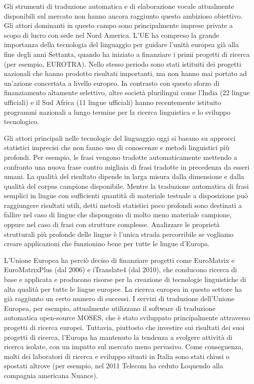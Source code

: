 \documentclass[]{../../metanetpaper}
\begin{document}
\begin{multicols}{2}
Gli strumenti di traduzione automatica e di elaborazione vocale attualmente
disponibili sul mercato non hanno ancora raggiunto questo ambizioso
obiettivo. Gli attori dominanti in questo campo sono principalmente imprese
private a scopo di lucro con sede nel Nord America. L'UE ha compreso la grande
importanza della tecnologia del linguaggio per guidare l'unit\`{a} europea
gi\`{a} alla fine degli anni Settanta, quando ha iniziato a finanziare i primi
progetti di ricerca (per esempio, EUROTRA). Nello stesso periodo sono stati
istituiti dei progetti nazionali che hanno prodotto risultati importanti, ma
non hanno mai portato ad un'azione concertata a livello europeo. In contrasto
con questo sforzo di finanziamento altamente selettivo, altre societ\`{a}
plurilingui come l'India (22 lingue ufficiali) e il Sud Africa (11 lingue
ufficiali) hanno recentemente istituito programmi nazionali a lungo termine
per la ricerca linguistica e lo sviluppo tecnologico.

Gli attori principali nelle tecnologie del linguaggio oggi si basano su
approcci statistici imprecisi che non fanno uso di conoscenze e metodi
linguistici pi\`{u} profondi. Per esempio, le frasi vengono tradotte
automaticamente mettendo a confronto una nuova frase contro migliaia di frasi
tradotte in precedenza da esseri umani. La qualit\`{a} del risultato dipende
in larga misura dalla dimensione e dalla qualit\`{a} del corpus campione
disponibile. Mentre la traduzione automatica di frasi semplici in lingue con
sufficienti quantit\`{a} di materiale testuale a disposizione pu\`{o}
raggiungere risultati utili, detti metodi statistici poco profondi sono
destinati a fallire nel caso di lingue che dispongono di molto meno materiale
campione, oppure nel caso di frasi con strutture complesse. Analizzare le
propriet\`{a} strutturali pi\`{u} profonde delle lingue \`{e} l'unica strada
percorribile se vogliamo creare applicazioni che funzionino bene per tutte le
lingue d'Europa. 



L'Unione Europea ha perci\`{o} deciso di finanziare progetti come EuroMatrix e
EuroMatrixPlus (dal 2006) e iTranslate4 (dal 2010), che conducono ricerca di
base e applicata e producono risorse per la creazione di tecnologie
linguistiche di alta qualit\`{a} per tutte le lingue europee. 
La ricerca europea in questo settore ha gi\`{a} raggiunto un certo numero di
successi. I servizi di traduzione dell'Unione Europea, per esempio,
attualmente utilizzano il software di traduzione automatica open-source MOSES,
che \`{e} stato sviluppato principalmente attraverso progetti di ricerca
europei. Tuttavia, piuttosto che investire sui risultati dei suoi progetti di
ricerca, l'Europa ha mantenuto la tendenza a svolgere attivit\`{a} di ricerca
isolate, con un impatto sul mercato meno pervasivo. Come conseguenza,
molti dei laboratori di ricerca e sviluppo situati in Italia sono
stati chiusi o spostati altrove (per esempio, nel 2011 Telecom ha ceduto
Loquendo alla compagnia americana Nuance).



\end{multicols}
\end{document}
